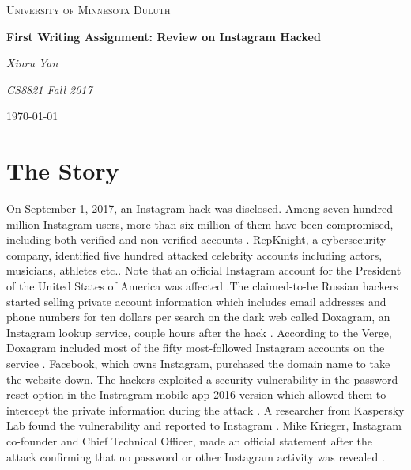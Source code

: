 \documentclass[12pt]{article}
\begin{document}
\begin{titlepage}
	\centering
	{\scshape\LARGE University of Minnesota Duluth \par}
	\vspace{1cm}
	{\scshape\Large \par}
	\vspace{1.5cm}
	{\huge\bfseries First Writing Assignment: Review on Instagram Hacked\par}
	\vspace{2cm}
	{\Large\itshape Xinru Yan\par}
	\vspace{2cm}
	{\Large\itshape CS8821 Fall 2017\par}

	\vfill

	{\large \today\par}
\end{titlepage}

\doublespacing

\section{The Story}
On September 1, 2017, an Instagram hack was disclosed. Among seven hundred million Instagram users, more than six million of them have been compromised, including both verified and non-verified accounts \cite{SE}\cite{CNN}. RepKnight, a cybersecurity company, identified five hundred attacked celebrity accounts including actors, musicians, athletes etc.. Note that an official Instagram account for the President of the United States of America was affected \cite{CTN}.The claimed-to-be Russian hackers started selling private account information which includes email addresses and phone numbers for ten dollars per search on the dark web called Doxagram, an Instagram lookup service, couple hours after the hack \cite{TDD}. According to the Verge, Doxagram included most of the fifty most-followed Instagram accounts on the service \cite{TV}. Facebook, which owns Instagram, purchased the domain name to take the website down. The hackers exploited a security vulnerability in the password reset option in the Instragram mobile app 2016 version which allowed them to intercept the private information during the attack \cite{CTN}. A researcher from Kaspersky Lab found the vulnerability and reported to Instagram \cite{THN}. Mike Krieger, Instagram co-founder and Chief Technical Officer, made an official statement after the attack confirming that no password or other Instagram activity was revealed \cite{INS}. 
\end{document}
